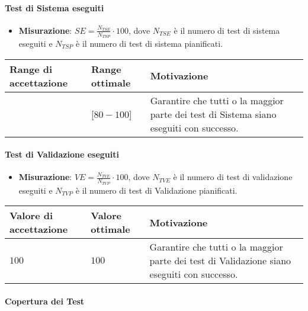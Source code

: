 \paragraph{Test di Sistema eseguiti}

\begin{itemize}
\item \textbf{Misurazione}: $SE=\frac{N_{TSE}}{N_{TSP}} \cdot 100$, dove $N_{TSE}$ è il numero di test di sistema eseguiti e $N_{TSP}$ è il numero di test di sistema pianificati.
\end{itemize}

\begin{center}
		\begin{tabular}{|P{2.5cm}|P{2.5cm}|P{6cm}|}
		\hline
			\textbf{Range di accettazione}	& \textbf{Range ottimale} & \textbf{Motivazione} \\
			\hline
			[$70 - 100$] & [$80 - 100$] &	Garantire che tutti o la maggior parte dei test di Sistema siano eseguiti con successo. \\
			\hline
			\end{tabular}
\end{center}

\paragraph{Test di Validazione eseguiti}

\begin{itemize}
\item \textbf{Misurazione}: $VE=\frac{N_{TVE}}{N_{TVP}} \cdot 100$, dove $N_{TVE}$ è il numero di test di validazione eseguiti e $N_{TVP}$ è il numero di test di Validazione pianificati.
\end{itemize}

\begin{center}
		\begin{tabular}{|P{2.5cm}|P{2.5cm}|P{6cm}|}
		\hline
			\textbf{Valore di accettazione}	& \textbf{Valore ottimale} & \textbf{Motivazione} \\
			\hline
			$100$ & $100$ &	Garantire che tutti o la maggior parte dei test di Validazione siano eseguiti con successo. \\
			\hline
			\end{tabular}
\end{center}

\paragraph{Copertura dei Test}

